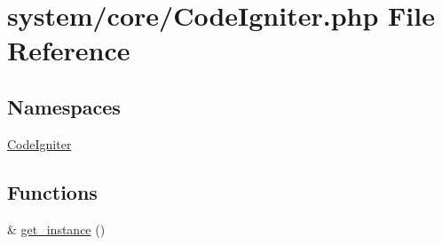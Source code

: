 \hypertarget{_code_igniter_8php}{}\section{system/core/\+Code\+Igniter.php File Reference}
\label{_code_igniter_8php}
\subsection*{Namespaces}
\begin{DoxyCompactItemize}
\item 
 \mbox{\hyperlink{namespace_code_igniter}{Code\+Igniter}}
\end{DoxyCompactItemize}
\subsection*{Functions}
\begin{DoxyCompactItemize}
\item 
\& \mbox{\hyperlink{_code_igniter_8php_a185483844bd20a0e80955460d66d2199}{get\+\_\+instance}} ()
\end{DoxyCompactItemize}
